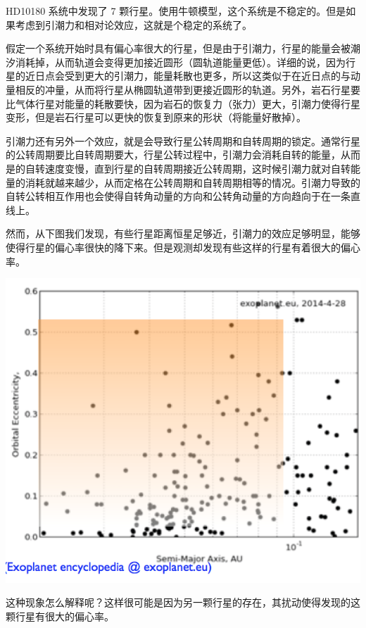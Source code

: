 \documentclass[letterpaper,10pt,english]{sphinxmanual}
\begin{document}
HD10180 系统中发现了 7 颗行星。使用牛顿模型，这个系统是不稳定的。但是如果考虑到引潮力和相对论效应，这就是个稳定的系统了。

假定一个系统开始时具有偏心率很大的行星，但是由于引潮力，行星的能量会被潮汐消耗掉，从而轨道会变得更加接近圆形（圆轨道能量更低）。详细的说，因为行星的近日点会受到更大的引潮力，能量耗散也更多，所以这类似于在近日点的与动量相反的冲量，从而将行星从椭圆轨道带到更接近圆形的轨道。另外，岩石行星要比气体行星对能量的耗散要快，因为岩石的恢复力（张力）更大，引潮力使得行星变形，但是岩石行星可以更快的恢复到原来的形状（将能量好散掉）。

引潮力还有另外一个效应，就是会导致行星公转周期和自转周期的锁定。通常行星的公转周期要比自转周期要大，行星公转过程中，引潮力会消耗自转的能量，从而是的自转速度变慢，直到行星的自转周期接近公转周期，这时候引潮力就对自转能量的消耗就越来越少，从而定格在公转周期和自转周期相等的情况。引潮力导致的自转公转相互作用也会使得自转角动量的方向和公转角动量的方向趋向于在一条直线上。

然而，从下图我们发现，有些行星距离恒星足够近，引潮力的效应足够明显，能够使得行星的偏心率很快的降下来。但是观测却发现有些这样的行星有着很大的偏心率。

{\hfill\includegraphics{eVSSemiAxis.png}\hfill}

这种现象怎么解释呢？这样很可能是因为另一颗行星的存在，其扰动使得发现的这颗行星有很大的偏心率。
\end{document}
